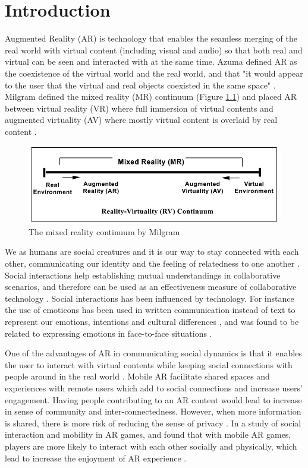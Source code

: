 \chapter{Introduction}
\label{ch:intro}

Augmented Reality (AR) is technology that enables the seamless merging of the real world with virtual content (including visual and audio) so that both real and virtual can be seen and interacted with at the same time. Azuma defined AR as the coexistence of the virtual world and the real world, and that "it would appear to the user that the virtual and real objects coexisted in the same space"  \cite{azuma1997survey}. Milgram defined the mixed reality (MR) continuum (Figure \ref{fig:mr-continuum}) and placed AR between virtual reality (VR) where full immersion of virtual contents and augmented virtuality (AV) where mostly virtual content is overlaid by real content \cite{Milgram1995a}. 

\begin{figure}
    \centering
    \includegraphics[width=.8\linewidth]{images/mixed-reality-continuum.png}
    \caption{The mixed reality continuum by Milgram \cite{Milgram1995a}}
    \label{fig:mr-continuum}
\end{figure}

We as humans are social creatures and it is our way to stay connected with each other, communicating our identity and the feeling of relatedness to one another \cite{HuangWeidong2013}. Social interactions help establishing mutual understandings in collaborative scenarios, and therefore can be used as an effectiveness measure of collaborative technology \cite{Li2013}. Social interactions has been influenced by technology. For instance the use of emoticons has been used in written communication instead of text to represent our emotions, intentions and cultural differences \cite{Pavalanathan2016}, and was found to be related to expressing emotions in face-to-face situations \cite{Derks2007}. 

One of the advantages of AR in communicating social dynamics is that it enables the user to interact with virtual contents while keeping social connections with people around in the real world \cite{HuangWeidong2013}. Mobile AR facilitate shared spaces and experiences with remote users which add to social connections and increase users' engagement. Having people contributing to an AR content would lead to increase in sense of community and inter-connectedness. However, when more information is shared, there is more risk of reducing the sense of privacy \cite{Olsson2013}. In a study of social interaction and mobility in AR games, and found that with mobile AR games, players are more likely to interact with each other socially and physically, which lead to increase the enjoyment of AR experience \cite{Schmalstieg_144}. 

